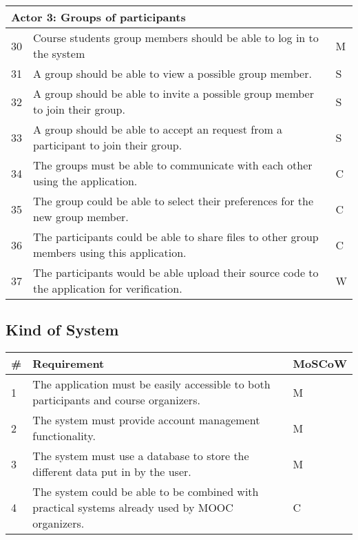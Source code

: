 \begin{tabular}{ | p{0.5cm} | p{12cm} | p{2cm} | }
\hline
\multicolumn{3}{|p{14.5cm}|}{\textbf{Actor 3: Groups of participants}} \\ \hline
30 & Course students group members should be able to log in to the system & M \\ \hline
31 & A group should be able to view a possible group member. & S \\ \hline
32 & A group should be able to invite a possible group member to join their group. & S \\ \hline
33 & A group should be able to accept an request from a participant to join their group. & S \\ \hline
34 & The groups must be able to communicate with each other using the application. & C \\ \hline
35 & The group could be able to select their preferences for the new group member. & C \\ \hline
36 & The participants could be able to share files to other group members using this application. & C \\ \hline
37 & The participants would be able upload their source code to the application for verification. & W \\
\hline
\end{tabular}

\subsection{Kind of System}
\begin{tabular}{ | p{0.5cm} | p{12cm} | p{2cm} | }
\hline
\textbf{\#} & \textbf{Requirement} & \textbf{MoSCoW} \\ \hline
1 & The application must be easily accessible to both participants and course organizers. & M \\ \hline
2 & The system must provide account management functionality. & M \\ \hline
3 & The system must use a database to store the different data put in by the user. & M \\ \hline
4 & The system could be able to be combined with practical systems already used by MOOC organizers. & C \\
\hline
\end{tabular}

